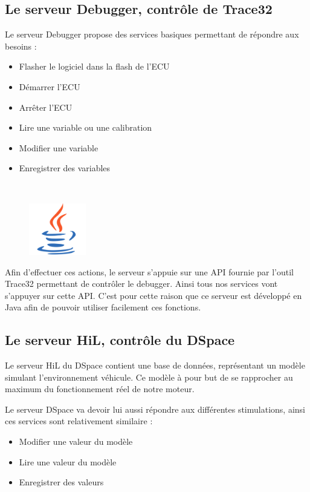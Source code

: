 \subsection{Le serveur Debugger, contrôle de Trace32}\label{T32server}
Le serveur Debugger propose des services basiques permettant de répondre aux besoins :
\begin{itemize}
	\item Flasher le logiciel dans la flash de l'ECU
	\item Démarrer l'ECU
	\item Arrêter l'ECU
	\item Lire une variable ou une calibration
	\item Modifier une variable
	\item Enregistrer des variables
\end{itemize}~

\begin{figure}
	\vspace{-40px}
	\includegraphics[width=2.5cm]{contents/images/logoJava.png}
\end{figure}
Afin d'effectuer ces actions, le serveur s'appuie sur une API fournie par l'outil Trace32 permettant de contrôler le debugger. Ainsi tous nos services vont s'appuyer sur cette API. C'est pour cette raison que ce serveur est développé en Java afin de pouvoir utiliser
facilement ces fonctions.

\subsection{Le serveur HiL, contrôle du DSpace}
Le serveur HiL du DSpace contient une base de données, représentant un modèle simulant l'environnement véhicule. Ce modèle à pour but de se rapprocher au maximum du fonctionnement réel de notre moteur.

Le serveur DSpace va devoir lui aussi répondre aux différentes stimulations, ainsi ces services sont relativement similaire : 
\begin{itemize}
	\item Modifier une valeur du modèle
	\item Lire une valeur du modèle
	\item Enregistrer des valeurs
\end{itemize}~

